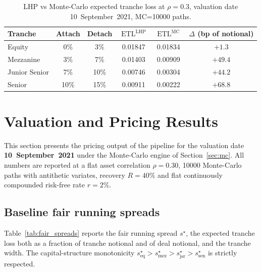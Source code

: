 \documentclass[11pt,a4paper]{article}
\newcommand{\1}{\mathbf{1}}
\DeclareMathOperator{\ETL}{ETL}
\begin{document}
\begin{table}[H]
\centering
\caption{LHP vs Monte-Carlo expected tranche loss at
\(\rho=0.3\), valuation date 10~September~2021, MC=\num{10000}
paths.}
\label{tab:lhp_mc}
\setlength{\tabcolsep}{8pt}
\begin{tabular}{l c c c c c}
\toprule
\textbf{Tranche} & \textbf{Attach} & \textbf{Detach}
& \textbf{\(\ETL^{\text{LHP}}\)} & \textbf{\(\ETL^{\text{MC}}\)}
& \textbf{\(\Delta\) (bp of notional)}\\
\midrule
Equity        & 0\%  & 3\%  & 0.01847 & 0.01834 & $+1.3$\\
Mezzanine     & 3\%  & 7\%  & 0.01403 & 0.00909 & $+49.4$\\
Junior Senior & 7\%  & 10\% & 0.00746 & 0.00304 & $+44.2$\\
Senior        & 10\% & 15\% & 0.00911 & 0.00222 & $+68.8$\\
\bottomrule
\end{tabular}
\end{table}

\section{Valuation and Pricing Results}\label{sec:pricing}

This section presents the pricing output of the pipeline for the
valuation date \textbf{10~September~2021} under the Monte-Carlo engine
of Section~\ref{sec:mc}. All numbers are reported at a flat asset
correlation \(\rho = 0.30\), \num{10000} Monte-Carlo paths with
antithetic variates, recovery \(R = 40\%\) and flat continuously
compounded risk-free rate \(r = 2\%\).

\subsection{Baseline fair running spreads}
Table~\ref{tab:fair_spreads} reports the fair running spread
\(s^{\star}\), the expected tranche loss both as a fraction of
tranche notional and of deal notional, and the tranche width. The
capital-structure monotonicity
\(s^{\star}_{\mathrm{eq}} > s^{\star}_{\mathrm{mez}}
>s^{\star}_{\mathrm{jsr}}>s^{\star}_{\mathrm{sen}}\)
is strictly respected.
\end{document}
